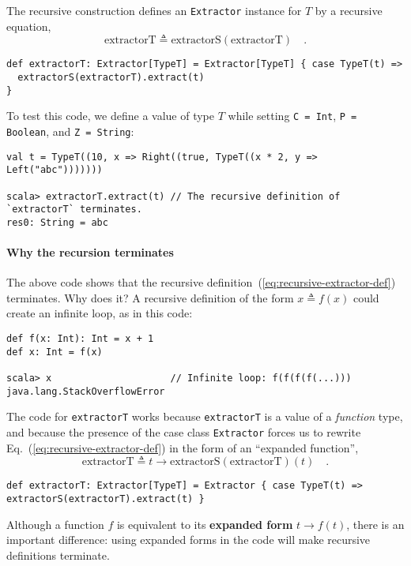The recursive construction defines an \lstinline!Extractor! instance
for $T$ by a recursive equation,
\begin{equation}
\text{extractorT}\triangleq\text{extractorS}\left(\text{extractorT}\right)\quad.\label{eq:recursive-extractor-def}
\end{equation}
\begin{lstlisting}
def extractorT: Extractor[TypeT] = Extractor[TypeT] { case TypeT(t) =>
  extractorS(extractorT).extract(t)
}
\end{lstlisting}
To test this code, we define a value of type $T$ while setting \lstinline!C = Int!,
\lstinline!P = Boolean!, and \lstinline!Z = String!:
\begin{lstlisting}
val t = TypeT((10, x => Right((true, TypeT((x * 2, y => Left("abc")))))))

scala> extractorT.extract(t) // The recursive definition of `extractorT` terminates.
res0: String = abc
\end{lstlisting}


\paragraph{Why the recursion terminates}

The above code shows that the recursive definition~(\ref{eq:recursive-extractor-def})
terminates. Why does it? A recursive definition of the form $x\triangleq f(x)$
could create an infinite loop, as in this code:
\begin{lstlisting}
def f(x: Int): Int = x + 1
def x: Int = f(x)

scala> x                     // Infinite loop: f(f(f(f(...)))
java.lang.StackOverflowError
\end{lstlisting}
The code for \lstinline!extractorT! works because \lstinline!extractorT!
is a value of a \emph{function} type, and because the presence of
the case class \lstinline!Extractor! forces us to rewrite Eq.~(\ref{eq:recursive-extractor-def})
in the form of an \textsf{``}expanded function\textsf{''}, 
\[
\text{extractorT}\triangleq t\rightarrow\text{extractorS}\left(\text{extractorT}\right)(t)\quad.
\]
\begin{lstlisting}
def extractorT: Extractor[TypeT] = Extractor { case TypeT(t) => extractorS(extractorT).extract(t) }
\end{lstlisting}
Although a function $f$ is equivalent to its \textbf{expanded form}
 $t\rightarrow f(t)$,
there is an important difference: using expanded forms in the code
will make recursive definitions 
terminate.

